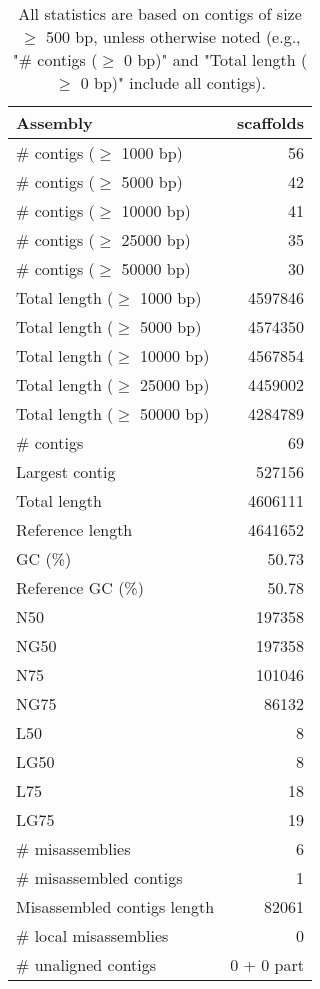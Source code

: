 \documentclass[12pt,a4paper]{article}
\begin{document}
\begin{table}[ht]
\begin{center}
\caption{All statistics are based on contigs of size $\geq$ 500 bp, unless otherwise noted (e.g., "\# contigs ($\geq$ 0 bp)" and "Total length ($\geq$ 0 bp)" include all contigs).}
\begin{tabular}{|l*{1}{|r}|}
\hline
Assembly & scaffolds \\ \hline
\# contigs ($\geq$ 1000 bp) & 56 \\ \hline
\# contigs ($\geq$ 5000 bp) & 42 \\ \hline
\# contigs ($\geq$ 10000 bp) & 41 \\ \hline
\# contigs ($\geq$ 25000 bp) & 35 \\ \hline
\# contigs ($\geq$ 50000 bp) & 30 \\ \hline
Total length ($\geq$ 1000 bp) & 4597846 \\ \hline
Total length ($\geq$ 5000 bp) & 4574350 \\ \hline
Total length ($\geq$ 10000 bp) & 4567854 \\ \hline
Total length ($\geq$ 25000 bp) & 4459002 \\ \hline
Total length ($\geq$ 50000 bp) & 4284789 \\ \hline
\# contigs & 69 \\ \hline
Largest contig & 527156 \\ \hline
Total length & 4606111 \\ \hline
Reference length & 4641652 \\ \hline
GC (\%) & 50.73 \\ \hline
Reference GC (\%) & 50.78 \\ \hline
N50 & 197358 \\ \hline
NG50 & 197358 \\ \hline
N75 & 101046 \\ \hline
NG75 & 86132 \\ \hline
L50 & 8 \\ \hline
LG50 & 8 \\ \hline
L75 & 18 \\ \hline
LG75 & 19 \\ \hline
\# misassemblies & 6 \\ \hline
\# misassembled contigs & 1 \\ \hline
Misassembled contigs length & 82061 \\ \hline
\# local misassemblies & 0 \\ \hline
\# unaligned contigs & 0 + 0 part \\ \hline

\end{tabular}
\end{center}
\end{table}
\end{document}
